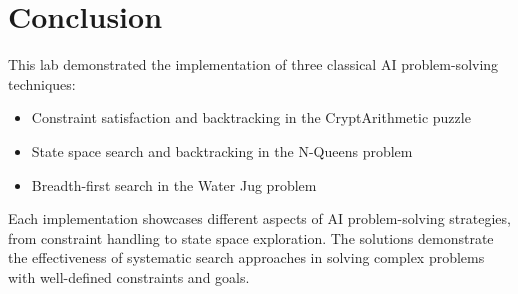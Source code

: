 \documentclass[11pt,a4paper]{article}
\begin{document}
\section{Conclusion}

This lab demonstrated the implementation of three classical AI problem-solving techniques:
\begin{itemize}
    \item Constraint satisfaction and backtracking in the CryptArithmetic puzzle
    \item State space search and backtracking in the N-Queens problem
    \item Breadth-first search in the Water Jug problem
\end{itemize}

Each implementation showcases different aspects of AI problem-solving strategies, from constraint handling to state space exploration. The solutions demonstrate the effectiveness of systematic search approaches in solving complex problems with well-defined constraints and goals.
\end{document}
